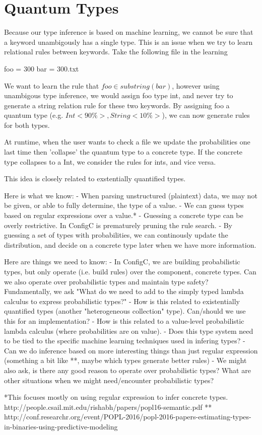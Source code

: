 \section{Quantum Types}

Because our type inference is based on machine learning, we cannot be sure that a keyword unambigously has a single type.
This is an issue when we try to learn relational rules between keywords.
Take the following file in the learning

foo = 300
bar = 300.txt

We want to learn the rule that $foo \in {substring(bar)}$, however using unambigous type inference, we would assign foo type int, and never try to generate a string relation rule for these two keywords.
By assigning foo a quantum type (e.g. ${Int <90\%>, String <10\%>}$), we can now generate rules for both types.

At runtime, when the user wants to check a file we update the probabilities one last time then 'collapse' the quantum type to a concrete type.
If the concrete type collapses to a Int, we consider the rules for ints, and vice versa.

This idea is closely related to exstentially quantified types.

Here is what we know:
- When parsing unstructured (plaintext) data, we may not be given, or able to fully determine, the type of a value.
- We can guess types based on regular expressions over a value.*
- Guessing a concrete type can be overly restrictive. In ConfigC is prematurely pruning the rule search.
- By guessing a set of types with probabilities, we can continously update the distribution, and decide on a concrete type later when we have more information.

Here are things we need to know:
- In ConfigC, we are building probabilistic types, but only operate (i.e. build rules) over the component, concrete types. Can we also operate over probabilistic types and maintain type safety? Fundamentally, we ask "What do we need to add to the simply typed lambda calculus to express probabilistic types?"
- How is this related to existentially quantified types (another "heterogeneous collection" type). Can/should we use this for an implementation?
- How is this related to a value-level probabilistic lambda calculus (where probabilities are on value).
- Does this type system need to be tied to the specific machine learning techniques used in infering types?
- Can we do inference based on more interesting things than just regular expression (something a bit like **, maybe which types generate better rules)
- We might also ask, is there any good reason to operate over probabilistic types? What are other situations when we might need/encounter probabilistic types?

*This focuses mostly on using regular expression to infer concrete types. http://people.csail.mit.edu/rishabh/papers/popl16-semantic.pdf
** http://conf.researchr.org/event/POPL-2016/popl-2016-papers-estimating-types-in-binaries-using-predictive-modeling
